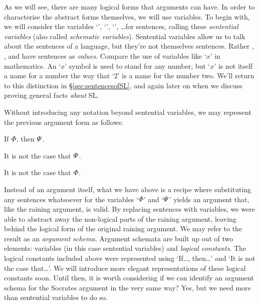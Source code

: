 As we will see, there are many logical forms that arguments can have.
In order to characterise the abstract forms themselves, we will use variables.
To begin with, we will consider the variables `\metaA{}', `\metaB{}', `\metaC{}', \ldots for sentences, calling these \textit{sentential variables} (also called \textit{schematic variables}).
Sentential variables allow us to talk about the sentences of a language, but they're not themselves sentences.
Rather \metaA{}, \metaB{}, and \metaC{} have sentences as \textit{values}.
Compare the use of variables like `$x$' in mathematics.
An `$x$' symbol is used to stand for any number, but `$x$' is not itself a name for a number the way that `2' is a name for the number two.
We'll return to this distinction in \S\ref{sec:sentencesofSL}, and again later on when we discuss proving general facts \textit{about} SL.

Without introducing any notation beyond sentential variables, we may represent the previous argument form as follows:

\begin{earg}
  \item If $\varPhi{}$, then $\varPsi{}$.
  \item It is not the case that $\varPsi{}$.
  \item[\therefore] It is not the case that $\varPhi{}$.
\end{earg}

Instead of an argument itself, what we have above is a recipe where substituting any sentences whatsoever for the variables `$\varPhi{}$' and `$\varPsi{}$' yields an argument that, like the raining argument, is valid.
By replacing sentences with variables, we were able to abstract away the non-logical parts of the raining argument, leaving behind the logical form of the original raining argument.
We may refer to the result as an \textit{argument schema}.
Argument schemata are built up out of two elements: variables (in this case sentential variables) and \textit{logical constants}.
The logical constants included above were represented using `If\ldots, then\ldots' and `It is not the case that\ldots'.
We will introduce more elegant representations of these logical constants soon.
Until then, it is worth considering if we can identify an argument schema for the Socrates argument in the very same way?
Yes, but we need more than sentential variables to do so.







